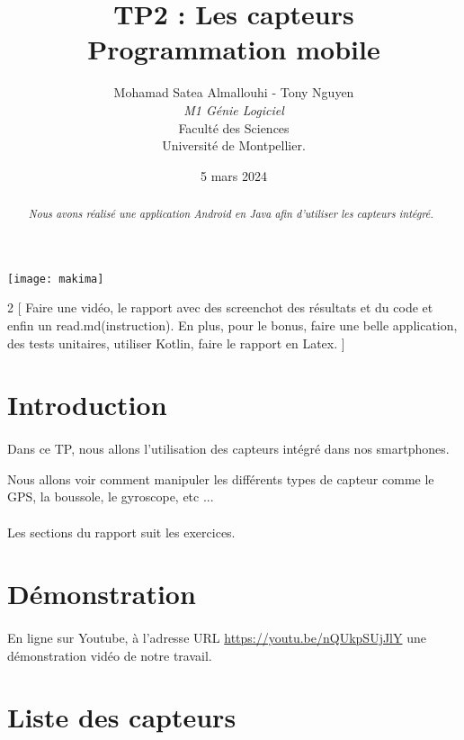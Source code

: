 \documentclass[a4paper]{article}
\title{  TP2 : Les capteurs\\Programmation mobile}
\author{Mohamad Satea Almallouhi - Tony Nguyen\\\emph{M1 Génie Logiciel}\\Faculté des Sciences\\Université de Montpellier.}
\date{5 mars 2024}
\begin{document}
    \maketitle
    \begin{center}
    \texttt{[image: makima]}
    \end{center}

    \begin{abstract}     %
      \emph{Nous avons réalisé une application Android en Java afin d'utiliser les capteurs intégré.}
    \end{abstract}
    \newpage
    \tableofcontents

    \newpage
    \begin{multicols}{2}
        [
            Faire une vidéo, le rapport avec des screenchot des résultats et du code et enfin un read.md(instruction). En plus, pour le bonus, faire une belle application, des tests unitaires, utiliser Kotlin, faire le rapport en Latex.
        ]
        \section*{Introduction}
        \paragraph{}
            Dans ce TP, nous allons l'utilisation des capteurs intégré dans nos smartphones.
            
            Nous allons voir comment manipuler les différents types de capteur comme le GPS, la boussole, le gyroscope, etc ...
        \paragraph{}
            Les sections du rapport suit les exercices.
        \section*{Démonstration}
            \paragraph{}
            En ligne sur Youtube, à l'adresse URL \url{https://youtu.be/nQUkpSUjJlY} une démonstration vidéo de notre travail.
        \section{Liste des capteurs}

\end{multicols}
\end{document}
